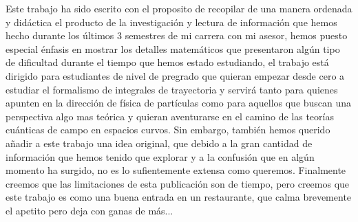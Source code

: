 Este trabajo ha sido escrito con el proposito de recopilar de una manera ordenada y didáctica el producto de la investigación y lectura de información que hemos hecho durante los últimos 3 semestres de mi carrera con mi asesor, hemos puesto especial énfasis en mostrar los detalles matemáticos que presentaron algún tipo de dificultad durante el tiempo que hemos estado estudiando, el trabajo está dirigido para estudiantes de nivel de pregrado que quieran empezar desde cero a estudiar el formalismo de integrales de trayectoria y servirá tanto para quienes apunten en la dirección de física de partículas como para aquellos que buscan una perspectiva algo mas teórica y quieran aventurarse en el camino de las teorías cuánticas de campo en espacios curvos. Sin embargo, también hemos querido añadir a este trabajo una idea original, que debido a la gran cantidad de información que hemos tenido que explorar y a la confusión que en algún momento ha surgido, no es lo sufientemente extensa como queremos. Finalmente creemos que las limitaciones de esta publicación son de tiempo, pero creemos que este trabajo es como una buena entrada en un restaurante, que calma brevemente el apetito pero deja con ganas de más...
